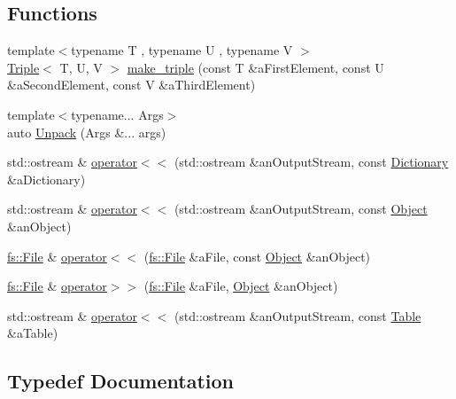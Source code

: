\subsection*{Functions}
\begin{DoxyCompactItemize}
\item 
{\footnotesize template$<$typename T , typename U , typename V $>$ }\\\hyperlink{structostk_1_1core_1_1ctnr_1_1_triple}{Triple}$<$ T, U, V $>$ \hyperlink{namespaceostk_1_1core_1_1ctnr_ae073c65f208c5d6ff9cfdb026ded7fea}{make\+\_\+triple} (const T \&a\+First\+Element, const U \&a\+Second\+Element, const V \&a\+Third\+Element)
\item 
{\footnotesize template$<$typename... Args$>$ }\\auto \hyperlink{namespaceostk_1_1core_1_1ctnr_a625c2cc96b397db1d78934d7fc9d55d4}{Unpack} (Args \&... args)
\item 
std\+::ostream \& \hyperlink{namespaceostk_1_1core_1_1ctnr_aa77029ea8af444700303a6dc1099df41}{operator$<$$<$} (std\+::ostream \&an\+Output\+Stream, const \hyperlink{classostk_1_1core_1_1ctnr_1_1_dictionary}{Dictionary} \&a\+Dictionary)
\item 
std\+::ostream \& \hyperlink{namespaceostk_1_1core_1_1ctnr_a3a9318c8c22061dadf14597ccb22b353}{operator$<$$<$} (std\+::ostream \&an\+Output\+Stream, const \hyperlink{classostk_1_1core_1_1ctnr_1_1_object}{Object} \&an\+Object)
\item 
\hyperlink{classostk_1_1core_1_1fs_1_1_file}{fs\+::\+File} \& \hyperlink{namespaceostk_1_1core_1_1ctnr_ad662a1eb6b984c689ca0bdb25d8f4c90}{operator$<$$<$} (\hyperlink{classostk_1_1core_1_1fs_1_1_file}{fs\+::\+File} \&a\+File, const \hyperlink{classostk_1_1core_1_1ctnr_1_1_object}{Object} \&an\+Object)
\item 
\hyperlink{classostk_1_1core_1_1fs_1_1_file}{fs\+::\+File} \& \hyperlink{namespaceostk_1_1core_1_1ctnr_a5dd7118475404fb96f6900bd5b1ccfc8}{operator$>$$>$} (\hyperlink{classostk_1_1core_1_1fs_1_1_file}{fs\+::\+File} \&a\+File, \hyperlink{classostk_1_1core_1_1ctnr_1_1_object}{Object} \&an\+Object)
\item 
std\+::ostream \& \hyperlink{namespaceostk_1_1core_1_1ctnr_af1511d4fd1b7a7bfcf1d272a1a95f143}{operator$<$$<$} (std\+::ostream \&an\+Output\+Stream, const \hyperlink{classostk_1_1core_1_1ctnr_1_1_table}{Table} \&a\+Table)
\end{DoxyCompactItemize}


\subsection{Typedef Documentation}
\mbox{\label{namespaceostk_1_1core_1_1ctnr_a5802e21d045076175dcb310a7045c858}} 
